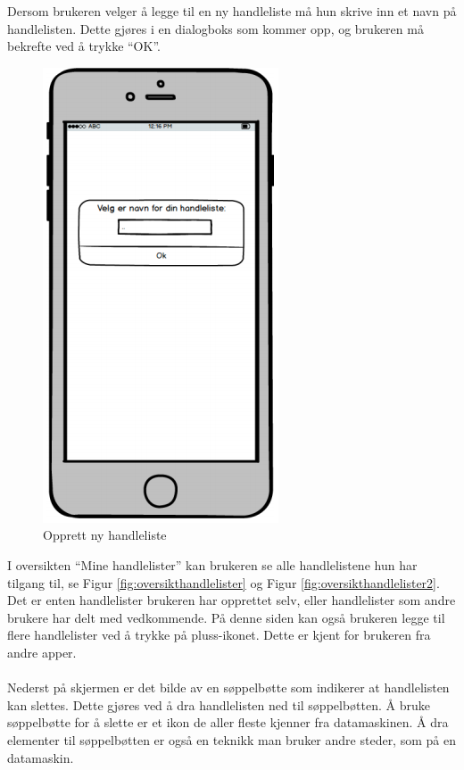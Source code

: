 \noindent Dersom brukeren velger å legge til en ny handleliste må hun skrive inn et navn på handlelisten. Dette gjøres i en dialogboks som kommer opp, og brukeren må bekrefte ved å trykke “OK”. 

\begin{figure}[H]
\includegraphics[scale=0.5]{images/prototype1/oppretthandleliste}
\centering %
\caption{Opprett ny handleliste}
\label{fig:oppretthandleliste}
\end{figure}

\noindent I oversikten “Mine handlelister” kan brukeren se alle handlelistene hun har tilgang til, se Figur \ref{fig:oversikthandlelister} og Figur \ref{fig:oversikthandlelister2}. Det er enten handlelister brukeren har opprettet selv, eller handlelister som andre brukere har delt med vedkommende. På denne siden kan også brukeren legge til flere handlelister ved å trykke på pluss-ikonet. Dette er kjent for brukeren fra andre apper.
\\\\
Nederst på skjermen er det bilde av en søppelbøtte som indikerer at handlelisten kan slettes. Dette gjøres ved å dra handlelisten ned til søppelbøtten. Å bruke søppelbøtte for å slette er et ikon de aller fleste kjenner fra datamaskinen. Å dra elementer til søppelbøtten er også en teknikk man bruker andre steder, som på en datamaskin.

